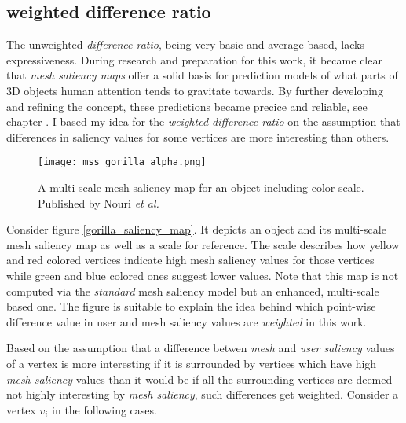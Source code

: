 		\subsection{weighted difference ratio}
		\label{sec:weighted_difference_ratio}
The unweighted \textit{difference ratio}, being very basic and average based, lacks expressiveness. During research and preparation for this work, it became clear that \textit{mesh saliency maps} offer a solid basis for prediction models of what parts of 3D objects human attention tends to gravitate towards. By further developing and refining the concept, these predictions became precice and reliable, see chapter \cite{sec:related_work}. I based my idea for the \textit{weighted difference ratio} on the assumption that differences in saliency values for some vertices are more interesting than others.

\begin{figure}[htb]
  \centering
  \texttt{[image: mss\_gorilla\_alpha.png]}\\ %
  \caption{A multi-scale mesh saliency map for an object including color scale. Published by Nouri \textit{et al.} \cite{nouri2015multi}}\label{fig:gorilla_saliency_map}
\end{figure}

Consider figure \ref{gorilla_saliency_map}. It depicts an object and its multi-scale mesh saliency map as well as a scale for reference. The scale describes how yellow and red colored vertices indicate high mesh saliency values for those vertices while green and blue colored ones suggest lower values. Note that this map is not computed via the \textit{standard} mesh saliency model but an enhanced, multi-scale based one. The figure is suitable to explain the idea behind which point-wise difference value in user and mesh saliency values are \textit{weighted} in this work.

Based on the assumption that a difference betwen \textit{mesh} and \textit{user saliency} values of a vertex is more interesting if it is surrounded by vertices which have high \textit{mesh saliency} values than it would be if all the surrounding vertices are deemed not highly interesting by \textit{mesh saliency}, such differences get weighted. Consider a vertex $v_i$ in the following cases.

